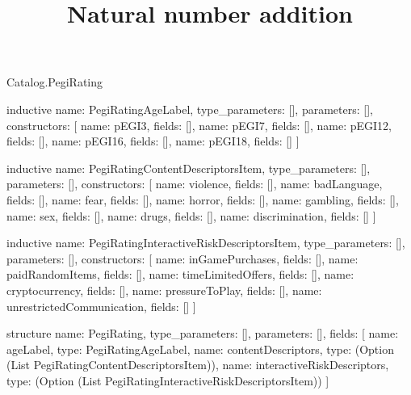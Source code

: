 \begin{lexlean}{Catalog.PegiRating}
\title{Natural number addition}
\begin{semanticmodule}
inductive{
  name: PegiRatingAgeLabel,
  type_parameters: [],
  parameters: [],
  constructors: [
    {name: pEGI3, fields: []},
    {name: pEGI7, fields: []},
    {name: pEGI12, fields: []},
    {name: pEGI16, fields: []},
    {name: pEGI18, fields: []}
  ]
}

inductive{
  name: PegiRatingContentDescriptorsItem,
  type_parameters: [],
  parameters: [],
  constructors: [
    {name: violence, fields: []},
    {name: badLanguage, fields: []},
    {name: fear, fields: []},
    {name: horror, fields: []},
    {name: gambling, fields: []},
    {name: sex, fields: []},
    {name: drugs, fields: []},
    {name: discrimination, fields: []}
  ]
}

inductive{
  name: PegiRatingInteractiveRiskDescriptorsItem,
  type_parameters: [],
  parameters: [],
  constructors: [
    {name: inGamePurchases, fields: []},
    {name: paidRandomItems, fields: []},
    {name: timeLimitedOffers, fields: []},
    {name: cryptocurrency, fields: []},
    {name: pressureToPlay, fields: []},
    {name: unrestrictedCommunication, fields: []}
  ]
}

structure{
  name: PegiRating,
  type_parameters: [],
  parameters: [],
  fields: [
    {name: ageLabel, type: PegiRatingAgeLabel},
    {name: contentDescriptors, type: (Option (List PegiRatingContentDescriptorsItem))},
    {name: interactiveRiskDescriptors, type: (Option (List PegiRatingInteractiveRiskDescriptorsItem))}
  ]
}
\end{semanticmodule}
\end{lexlean}
